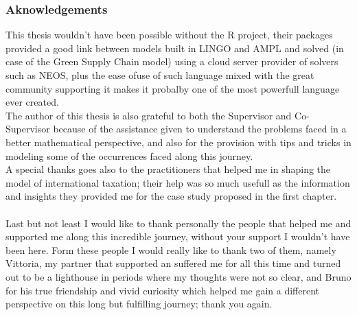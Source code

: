 \begin{doublespace}
\subsubsection{Aknowledgements}
This thesis wouldn't have been possible without the R project, their packages provided a good link between models built in LINGO and AMPL\cite{Fourer1997} and solved (in case of the Green Supply Chain model) using a cloud server provider of solvers such as NEOS, plus the ease ofuse of such language mixed with the great community supporting it makes it probalby one of the most powerfull language ever created. 
\\
The author of this thesis is also grateful to both the Supervisor and Co-Supervisor because of the assistance given to understand the problems faced in a better mathematical perspective, and also for the provision with tips and tricks in modeling some of the occurrences faced along this journey.
\\
A special thanks goes also to the practitioners that helped me in shaping the model of international taxation; their help was so much usefull as the information and insights they provided me for the case study proposed in the first chapter.
\\
\\
Last but not least I would like to thank personally the people that helped me and supported me along this incredible journey, without your support I wouldn't have been here. Form these people I would really like to thank two of them, namely Vittoria, my partner that supported an suffered me for all this time and turned out to be a lighthouse in periods where my thoughts were not so clear, and Bruno for his true friendship and vivid curiosity which helped me gain a different perspective on this long but fulfilling journey; thank you again.

\end{doublespace}

\clearpage{\pagestyle{empty}\cleardoublepage}
